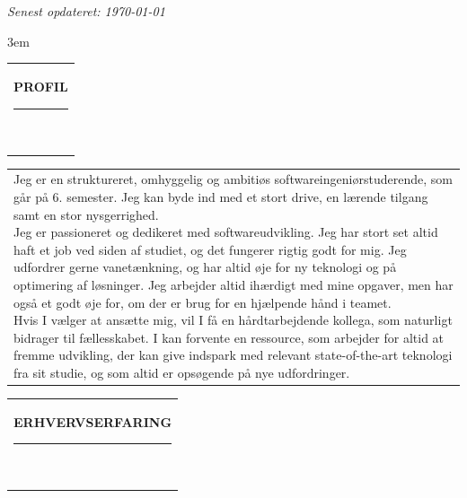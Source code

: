 \documentclass[10pt,A4]{article}
\newcommand{\mpwidth}{\linewidth-\fboxsep-\fboxsep}
\newcommand{\cvtext}[1] {
	\begin{tabular*}{1\mpwidth}{p{1\mpwidth}}
		\parbox{1\mpwidth}{#1}
	\end{tabular*}
}
\newcommand{\cvsection}[1] {
	\vspace{14pt}
	\cvtext{
		\textbf{\huge{\textcolor{darkcol}{\uppercase{#1}}}}\\[-4pt]
		\textcolor{maincol}{ \rule{0.1\textwidth}{2pt} } \\
	}
}
\begin{document}
\begin{paracol}{2}
\begin{rightcolumn}
		\textit{Senest opdateret: \today}

		\vfill\null
		\emergencystretch 3em
		\cvsection{PROFIL}

		\cvtext{Jeg er en struktureret, omhyggelig og ambitiøs softwareingeniørstuderende, som går på 6. semester. Jeg kan byde ind med et stort drive, en lærende tilgang samt en stor nysgerrighed.\\

			Jeg er passioneret og dedikeret med softwareudvikling. Jeg har stort set altid haft et job ved siden af studiet, og det fungerer rigtig godt for mig. Jeg udfordrer gerne vanetænkning, og har altid øje for ny teknologi og på optimering af løsninger. Jeg arbejder altid ihærdigt med mine opgaver, men har også et godt øje for, om der er brug for en hjælpende hånd i teamet.\\

			Hvis I vælger at ansætte mig, vil I få en hårdtarbejdende kollega, som naturligt bidrager til fællesskabet. I kan forvente en ressource, som arbejder for altid at fremme udvikling, der kan give indspark med relevant state-of-the-art teknologi fra sit studie, og som altid er opsøgende på nye udfordringer.
		}

		\vfill\null
		\cvsection{ERHVERVSERFARING}


\end{rightcolumn}
\end{paracol}
\end{document}
